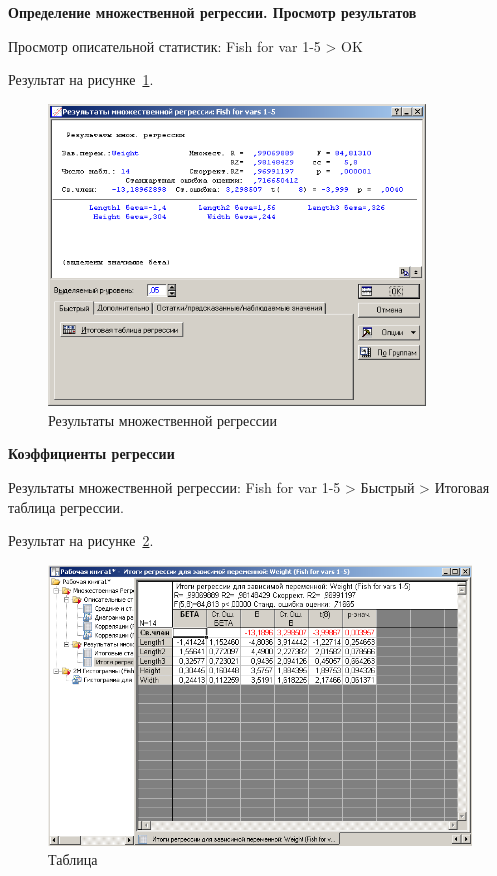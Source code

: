 \newpage

\begin{center}
  \textbf{Определение множественной регрессии. Просмотр результатов}
\end{center}

Просмотр описательной статистик: Fish for var 1-5 > OK

Результат на рисунке~\ref{fig:var5__20}.

\begin{figure}[!h]
  \centering

  \includegraphics[height=8cm]
  {inc/var5__20.PNG}

  \caption{Результаты множественной регрессии}

  \label{fig:var5__20}
\end{figure}

\newpage

\begin{center}
  \textbf{Коэффициенты регрессии}
\end{center}

Результаты множественной регрессии: Fish for var 1-5 > Быстрый > Итоговая таблица регрессии.

Результат на рисунке~\ref{fig:var5__21}.

\begin{figure}[!h]
  \centering

  \includegraphics[width=12cm]
  {inc/var5__21.PNG}

  \caption{Таблица}

  \label{fig:var5__21}
\end{figure}

